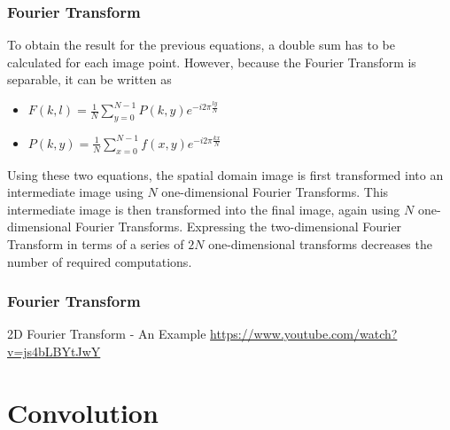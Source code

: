 \begin{frame}
    \frametitle{Fourier Transform}
    To obtain the result for the previous equations, a double sum has to be calculated for each image point. However, because the Fourier Transform is separable, it can be written as \newline

    \begin{itemize}
        \item $F(k,l) = \frac{1}{N}  \sum^{N-1}_{y=0}  P(k,y) e^{-i 2\pi \frac{ly}{N}}$ 
        \item $P(k,y) = \frac{1}{N}  \sum^{N-1}_{x=0}  f(x,y) e^{-i 2\pi \frac{kx}{N}}$
    \end{itemize}

Using these two equations, the spatial domain image is first transformed into an intermediate image using $N$ one-dimensional Fourier Transforms. This intermediate image is then transformed into the final image, again using $N$ one-dimensional Fourier Transforms. Expressing the two-dimensional Fourier Transform in terms of a series of $2N$ one-dimensional transforms decreases the number of required computations.

\end{frame}

\begin{frame}
    \frametitle{Fourier Transform}
    2D Fourier Transform - An Example
    \url{https://www.youtube.com/watch?v=js4bLBYtJwY}

\end{frame}


\subtitle{Convolution}
\frame[plain,c]{\titlepage}

\section{Convolution}%
\label{sec:convolution}


